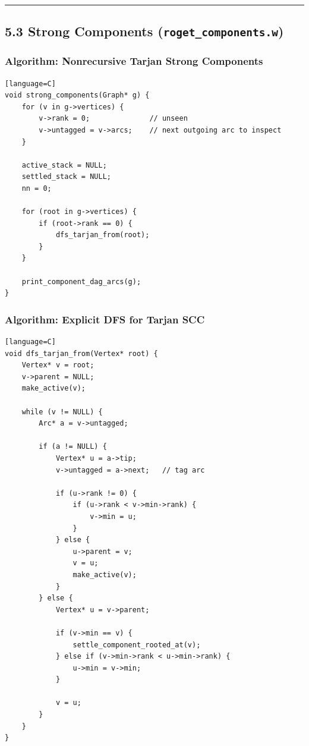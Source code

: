 \documentclass[11pt]{article}
\begin{document}
\begin{center}\rule{0.5\linewidth}{0.5pt}\end{center}

\subsection{\texorpdfstring{5.3 Strong Components (\texttt{roget\_components.w})}{5.3 Strong Components (roget\_components.w)}}\label{strong-components-roget_components.w}

\subsubsection{Algorithm: Nonrecursive Tarjan Strong Components}\label{algorithm-nonrecursive-tarjan-strong-components}

\begin{verbatim}[language=C]
void strong_components(Graph* g) {
    for (v in g->vertices) {
        v->rank = 0;              // unseen
        v->untagged = v->arcs;    // next outgoing arc to inspect
    }

    active_stack = NULL;
    settled_stack = NULL;
    nn = 0;

    for (root in g->vertices) {
        if (root->rank == 0) {
            dfs_tarjan_from(root);
        }
    }

    print_component_dag_arcs(g);
}
\end{verbatim}

\subsubsection{Algorithm: Explicit DFS for Tarjan SCC}\label{algorithm-explicit-dfs-for-tarjan-scc}

\begin{verbatim}[language=C]
void dfs_tarjan_from(Vertex* root) {
    Vertex* v = root;
    v->parent = NULL;
    make_active(v);

    while (v != NULL) {
        Arc* a = v->untagged;

        if (a != NULL) {
            Vertex* u = a->tip;
            v->untagged = a->next;   // tag arc

            if (u->rank != 0) {
                if (u->rank < v->min->rank) {
                    v->min = u;
                }
            } else {
                u->parent = v;
                v = u;
                make_active(v);
            }
        } else {
            Vertex* u = v->parent;

            if (v->min == v) {
                settle_component_rooted_at(v);
            } else if (v->min->rank < u->min->rank) {
                u->min = v->min;
            }

            v = u;
        }
    }
}
\end{verbatim}
\end{document}

